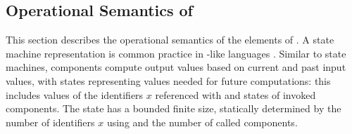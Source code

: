 \subsection{Operational Semantics of \GRSync}
\label{sec:semantics:grsync:opsem}

This section describes the operational semantics of the elements of \GRSync.
%
A state machine representation is common practice in \Lustre-like languages
\cite{DBLP:journals/tecs/ColacoMPP23}.
%
Similar to state machines, components compute output values based on current and past input values,
with states representing values needed for future computations: this includes values of the
identifiers $x$ referenced with  and states of invoked components.
%
The state has a bounded finite size, statically determined by the number of identifiers $x$ using
 and the number of called components.

